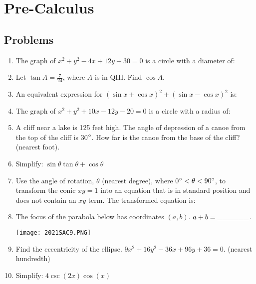 \documentclass[../uilmath.tex]{subfiles}
\begin{document}
\chapter{Pre-Calculus}
\section*{Problems}
\begin{enumerate}[label=\bfseries\arabic*.]
    \item %
    The graph of $x^2+y^2-4x+12y+30=0$ is a circle with a diameter of: 

    \item %
    Let $\tan A = \frac{7}{24}$, where $A$ is in QIII. Find $\cos A$.

    \item %
    An equivalent expression for $(\sin x + \cos x)^2+(\sin x - \cos x)^2$ is:

    \item %
    The graph of $x^2+y^2+10x-12y-20=0$ is a circle with a radius of:

    \item %
    A cliff near a lake is 125 feet high. The angle of depression of a canoe from the top of the cliff is 30$\degree$. How far is the canoe from the base of the cliff? (nearest foot).

    \item %
    Simplify: $\sin\theta \tan\theta + \cos\theta$

    \item %
    Use the angle of rotation, $\theta$ (nearest degree), where 0$\degree<\theta<90\degree$, to transform the conic $xy=1$ into an equation that is in standard position and does not contain an $xy$ term. The transformed equation is:

    \item %
    The focus of the parabola below has coordinates $(a,b)$. $a+b=\_\_\_\_\_\_$.
    \begin{center}
        \texttt{[image: 2021SAC9.PNG]}
    \end{center}

    \item %
    Find the eccentricity of the ellipse. $9x^2+16y^2-36x+96y+36=0$. (nearest hundredth)

    \item %
    Simplify: $4\csc(2x)\cos(x)$


\end{enumerate}
\end{document}
